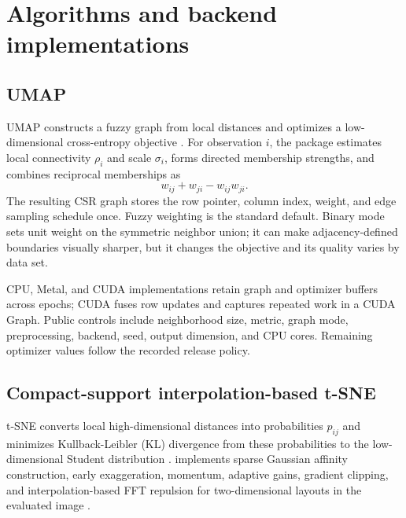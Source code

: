 \documentclass[article]{jss}
\newcommand{\fastEmbedR}{\pkg{fastEmbedR}\xspace}
\begin{document}
\section{Algorithms and backend implementations}

\subsection{UMAP}

UMAP constructs a fuzzy graph from local distances and optimizes a
low-dimensional cross-entropy objective \citep{mcinnes2018}. For observation
$i$, the package estimates local connectivity $\rho_i$ and scale $\sigma_i$,
forms directed membership strengths, and combines reciprocal memberships as
\[
  w_{ij} + w_{ji} - w_{ij}w_{ji}.
\]
The resulting CSR graph stores the row pointer, column index, weight, and edge
sampling schedule once. Fuzzy weighting is the standard default. Binary mode
sets unit weight on the symmetric neighbor union; it can make adjacency-defined
boundaries visually sharper, but it changes the objective and its quality
varies by data set.

CPU, Metal, and CUDA implementations retain graph and optimizer buffers
across epochs; CUDA fuses row updates and captures repeated work in a CUDA
Graph. Public controls include neighborhood size, metric, graph mode,
preprocessing, backend, seed, output dimension, and CPU cores. Remaining
optimizer values follow the recorded release policy.

\subsection{Compact-support interpolation-based t-SNE}

t-SNE converts local high-dimensional distances into probabilities $p_{ij}$
and minimizes Kullback-Leibler (KL) divergence from these probabilities to the
low-dimensional Student distribution \citep{vandermaaten2008}. \fastEmbedR
implements sparse Gaussian affinity construction, early exaggeration,
momentum, adaptive gains, gradient clipping, and interpolation-based FFT
repulsion for two-dimensional layouts in the evaluated image
\citep{linderman2019}.
\end{document}
